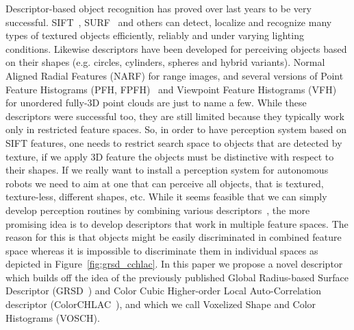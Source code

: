 \documentclass[conference]{sty/IEEEtran}
\begin{document}

Descriptor-based object recognition has proved over last years to be very successful.
SIFT~\cite{lowe04distinctive}, SURF~\cite{surf} and others can
detect, localize and recognize many types of textured objects efficiently, reliably
and under varying lighting conditions. Likewise descriptors have been developed 
for perceiving objects based on their shapes (e.g. circles, cylinders, spheres and hybrid variants).
Normal Aligned Radial Features (NARF)\cite{steder10irosws} for range images, 
and several versions of Point Feature  Histograms (PFH, FPFH)~\cite{Rusu09ICRA} and 
Viewpoint Feature Histograms (VFH)~\cite{vfh} for unordered fully-3D point clouds are just 
to name a few. While these descriptors were successful too, they are still limited because they
typically work only in restricted feature spaces. So, in order to have perception system
based on SIFT features, one needs to restrict search space to objects that are detected by
texture, if we apply 3D feature the objects must be distinctive with respect to their shapes. 
If we really want to install a perception system for autonomous robots we need to aim 
at one that can perceive all objects, that is textured, texture-less, different shapes, etc.
While it seems feasible that we can simply develop perception routines by combining
various descriptors~\cite{stueckler10combining, GRSD10Humanoids}, the more promising idea 
is to develop descriptors that work in multiple feature spaces. The reason for this is 
that objects might be easily discriminated in combined feature space whereas it is impossible 
to discriminate them in individual spaces as depicted in Figure~\ref{fig:grsd_cchlac}.
In this paper we propose a novel descriptor which builds off the idea of the previously 
published Global Radius-based Surface Descriptor (GRSD~\cite{GRSD10Humanoids}) and 
Color Cubic Higher-order Local Auto-Correlation descriptor (ColorCHLAC~\cite{kanezaki2010tvc}), 
and which we call Voxelized Shape and Color Histograms (VOSCH).
\end{document}
